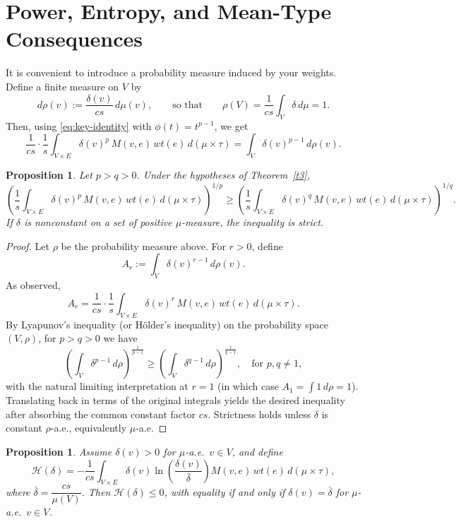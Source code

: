 \documentclass[final,1p,times]{elsarticle}
\newtheorem{prop}[thm]{Proposition}
\begin{document}
\section{Power, Entropy, and Mean-Type Consequences}

It is convenient to introduce a probability measure induced by your weights.
Define a finite measure on \(V\) by
\[
d\rho(v):=\frac{\delta(v)}{cs}\,d\mu(v),
\qquad\text{so that}\qquad
\rho(V)=\frac{1}{cs}\int_V\delta\,d\mu=1.
\]
Then, using \eqref{eq:key-identity} with \(\phi(t)=t^{p-1}\), we get
\[
\frac{1}{cs}\cdot \frac{1}{s}\int_{V\times E}\delta(v)^p\,M(v,e)\,wt(e)\,d(\mu\times\tau)
=\int_V \delta(v)^{p-1}\,d\rho(v).
\]

\begin{prop}
\label{cor:powermean-proof}
Let \(p>q>0\). Under the hypotheses of Theorem~\ref{t3},
\[
\left(
\frac{1}{s}\int_{V\times E}\delta(v)^p\,M(v,e)\,wt(e)\,d(\mu\times\tau)
\right)^{1/p}
\ge
\left(
\frac{1}{s}\int_{V\times E}\delta(v)^q\,M(v,e)\,wt(e)\,d(\mu\times\tau)
\right)^{1/q}.
\]
If \(\delta\) is nonconstant on a set of positive \(\mu\)-measure, the inequality is strict.
\end{prop}

\begin{proof}
Let \(\rho\) be the probability measure above. For \(r>0\), define
\[
A_r := \int_V \delta(v)^{r-1}\,d\rho(v).
\]
As observed,
\[
A_r = \frac{1}{cs}\cdot \frac{1}{s}\int_{V\times E}\delta(v)^r\,M(v,e)\,wt(e)\,d(\mu\times\tau).
\]
By Lyapunov's inequality (or Hölder's inequality) on the probability space \((V,\rho)\),
for \(p>q>0\) we have
\[
\left(\int_V \delta^{p-1}\,d\rho\right)^{\frac{1}{p-1}}
\ge
\left(\int_V \delta^{q-1}\,d\rho\right)^{\frac{1}{q-1}},
\quad\text{for }p,q\neq 1,
\]
with the natural limiting interpretation at \(r=1\) (in which case \(A_1=\int 1\,d\rho=1\)).
Translating back in terms of the original integrals yields the desired inequality after
absorbing the common constant factor \(cs\). Strictness holds unless \(\delta\) is constant \(\rho\)-a.e., equivalently \(\mu\)-a.e.
\end{proof}



\begin{prop}
\label{cor:entropy-proof}
Assume $\delta(v)>0$ for $\mu$-a.e.\ $v\in V$, and define
\[
\mathcal{H}(\delta)
=
-\frac{1}{cs}
\int_{V\times E}
\delta(v)\ln\!\left(\frac{\delta(v)}{\bar\delta}\right)
M(v,e)\,wt(e)\,d(\mu\times\tau),
\]
where $\bar\delta=\dfrac{cs}{\mu(V)}$.
Then $\mathcal{H}(\delta)\le 0$, with equality if and only if
$\delta(v)=\bar\delta$ for $\mu$-a.e.\ $v\in V$.
\end{prop}
\end{document}
